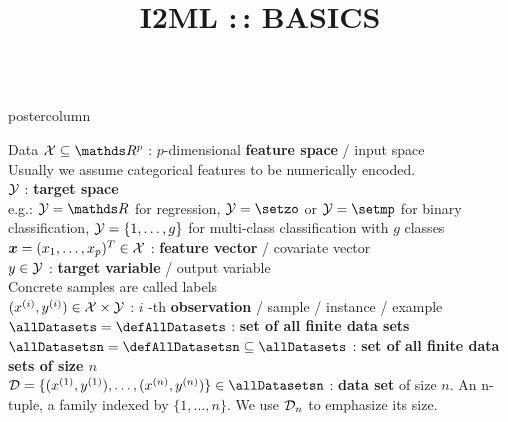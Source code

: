 \documentclass{beamer}
\title{I2ML :\,: BASICS} %
\newlength{\columnheight} %
\begin{document}
\begin{frame}[fragile]{}
\vspace{-8ex}
\begin{columns}
	\begin{column}{.31\textwidth}
		\begin{beamercolorbox}[center]{postercolumn}
			\begin{minipage}{.98\textwidth}
				\parbox[t][\columnheight]{\textwidth}{
\begin{myblock}{Data}
 $\Xspace \subseteq \R^p$ : $p$-dimensional \textbf{feature space} / input space\\ 
Usually we assume categorical features to be numerically encoded.\\

$\mathcal{Y}$ : \textbf{target space} \\ 
e.g.: $\Yspace = \R$ for regression, $\Yspace = \setzo$ or $\Yspace = \setmp$ for binary classification, $\mathcal{Y} = \{1, \ldots, g\}$ for multi-class classification with $g$ classes\\

$\bm{x} = (x_1, \ldots, x_p)^T \in \mathcal{X}$ : \textbf{feature vector} / covariate vector\\ 
 
$y \in \mathcal{Y}$ : \textbf{target variable} / output variable \\
Concrete samples are called labels \\

$(x^{(i)}, y^{(i)}) \in \mathcal{X}\times \mathcal{Y}$ : $i$ -th \textbf{observation} / sample / instance / example\\

$\allDatasets = \defAllDatasets$ : \textbf{set of all finite data sets} \\

$\allDatasetsn = \defAllDatasetsn \subseteq \allDatasets$ : \textbf{set of all finite data sets of size $n$} \\

$\D = \Dset \in \allDatasetsn $ : \textbf{data set} of size $n$.
An n-tuple, a family indexed by $\{1, \dots, n\}$. 
We use $\mathcal{D}_n$ to emphasize its size.\\
 

\end{myblock}}
\end{minipage}
\end{beamercolorbox}
\end{column}
\end{columns}
\end{frame}
\end{document}
